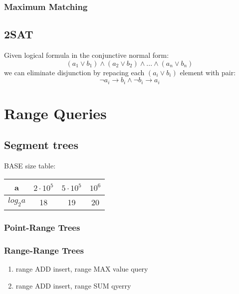 \documentclass[13pt]{article}
\begin{document}
\subsubsection{Maximum Matching}

\subsection{2SAT}

Given logical formula in the conjunctive normal form:
\[ (a_1 \vee b_1) \wedge  (a_2 \vee b_2) \wedge ... \wedge (a_{n} \vee b_{n})\]
we can eliminate disjunction by repacing each \( (a_i \vee b_i) \) element with pair:
\[ \neg a_i \rightarrow b_i \wedge \neg b_i \rightarrow a_i \]

\section{Range Queries}

\subsection{Segment trees}

BASE size table:
\begin{center}
	\begin{tabular}{ c || c | c | c }
		a          & \(2 \cdot 10^5\) & \(5 \cdot 10^5\) & \(10^6\) \\
		\hline\hline
		\(log_2a\) & 18               & 19               & 20
	\end{tabular}
\end{center}

\subsubsection{Point-Range Trees}



\subsubsection{Range-Range Trees}
\begin{enumerate}
	\item range ADD insert, range MAX value query
	      
	      
	\item range ADD insert, range SUM qyerry
	      
	      
\end{enumerate}
\end{document}
